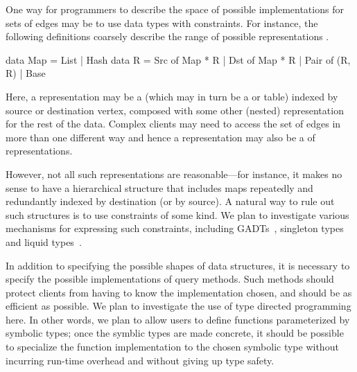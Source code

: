 One way for programmers to describe the space of possible
implementations for sets of edges may be to use data types with
constraints.  For instance, the following definitions coarsely
describe the range of possible representations .

\begin{mylisting}
data Map = List | Hash
data R = Src of Map * R | Dst of Map * R | Pair of (R, R) | Base
\end{mylisting}

Here, a representation  may be a  (which may in turn
be a  or  table) indexed by source
or destination vertex, composed with some other (nested) representation
for the rest of the data.  Complex clients may need to access the set of
edges in more than one different way and hence a representation may also
be a  of representations.

However, not all such representations are reasonable---for instance,
it makes no sense to have a hierarchical structure that includes
maps repeatedly and redundantly indexed by destination (or by source).
A natural way to rule out such structures is to use constraints of
some kind.  We plan to investigate various mechanisms for
expressing such constraints, including GADTs~\cite{gadts},
singleton types~\cite{weirich:singletons} and
liquid types~\cite{liquid-haskell}.

In addition to specifying the possible shapes of data structures,
it is necessary to specify the possible implementations of query
methods.  Such methods should protect clients from having to know
the implementation chosen, and should be as efficient as possible.
We plan to investigate the use of type directed programming here.
In other words, we plan to allow users to define functions parameterized
by symbolic types; once the symblic types are made concrete, it should
be possible to specialize the function implementation to the chosen
symbolic type without incurring run-time overhead and without giving up
type safety.









